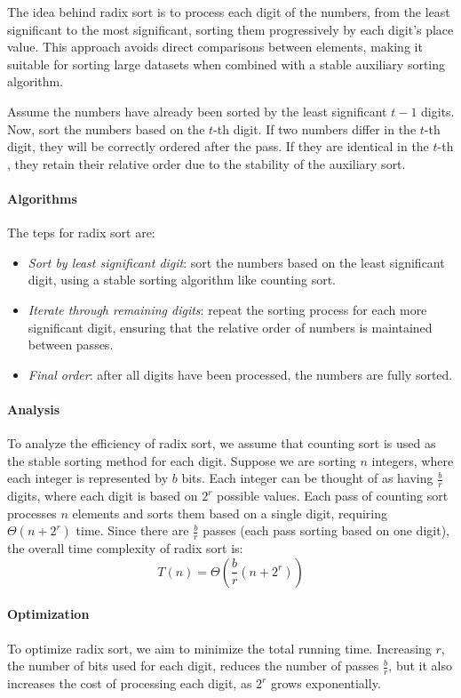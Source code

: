 The idea behind radix sort is to process each digit of the numbers, from the least significant to the most significant, sorting them progressively by each digit's place value. 
This approach avoids direct comparisons between elements, making it suitable for sorting large datasets when combined with a stable auxiliary sorting algorithm.

Assume the numbers have already been sorted by the least significant $t-1$ digits.
Now, sort the numbers based on the $t$-th digit. 
If two numbers differ in the $t$-th digit, they will be correctly ordered after the pass.
If they are identical in the $t$-th , they retain their relative order due to the stability of the auxiliary sort.

\paragraph*{Algorithms}
The teps for radix sort are: 
\begin{itemize}
    \item \textit{Sort by least significant digit}: sort the numbers based on the least significant digit, using a stable sorting algorithm like counting sort.
    \item \textit{Iterate through remaining digits}: repeat the sorting process for each more significant digit, ensuring that the relative order of numbers is maintained between passes.
    \item \textit{Final order}: after all digits have been processed, the numbers are fully sorted.
\end{itemize}

\paragraph*{Analysis}
To analyze the efficiency of radix sort, we assume that counting sort is used as the stable sorting method for each digit. 
Suppose we are sorting $n$ integers, where each integer is represented by $b$ bits. 
Each integer can be thought of as having $\frac{b}{r}$ digits, where each digit is based on $2^r$ possible values.
Each pass of counting sort processes $n$ elements and sorts them based on a single digit, requiring $\Theta(n + 2^r)$ time. 
Since there are $\frac{b}{r}$ passes (each pass sorting based on one digit), the overall time complexity of radix sort is:
\[T(n)=\Theta\left(\dfrac{b}{r}(n+2^r)\right)\]

\paragraph*{Optimization}
To optimize radix sort, we aim to minimize the total running time. 
Increasing $r$, the number of bits used for each digit, reduces the number of passes $\frac{b}{r}$, but it also increases the cost of processing each digit, as $2^r$ grows exponentially.

